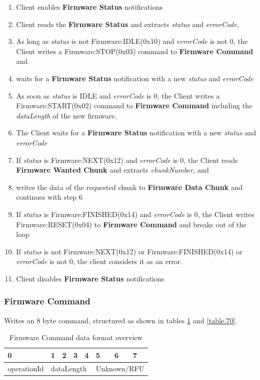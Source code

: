 \documentclass[a4paper]{article}
\begin{document}
\begin{enumerate}
	
	\item
	      Client enables \textbf{Firmware Status} notifications
	\item
	      Client reads the \textbf{Firmware Status} and extracts \emph{status}
	      and \emph{errorCode}.
	\item
	      As long as \emph{status} is not Firmware:IDLE(0x10) and \emph{errorCode} is not 0, 
	     the Client writes a Firmware:STOP(0x03) command to \textbf{Firmware Command} and
	\item
	      waits for a \textbf{Firmware Status} notification with a new
	      \emph{status} and \emph{errorCode}
	\item
	      As soon as \emph{status} is IDLE and \emph{errorCode} is 0, 
	      the Client writes a Firmware:START(0x02) command to \textbf{Firmware Command}
	      including the \emph{dataLength} of the new firmware.
	\item
	      The Client waits for a \textbf{Firmware Status} notification with a
	      new \emph{status} and \emph{errorCode}
	\item
	      If \emph{status} is Firmware:NEXT(0x12) and \emph{errorCode} is 0, 
	      the Client reads \textbf{Firmware Wanted Chunk} and extracts \emph{chunkNumber}, 
	      and
	\item
	      writes the data of the requested chunk to \textbf{Firmware Data Chunk}
	      and continues with step 6
	\item
	      If \emph{status} is Firmware:FINISHED(0x14) and \emph{errorCode} is 0,
	      the Client writes Firmware:RESET(0x04) to \textbf{Firmware Command}
	      and breaks out of the loop
	\item
	      If \emph{status} is not Firmware:NEXT(0x12) or Firmware:FINISHED(0x14)
	      or \emph{errorCode} is not 0, 
	      the client considers it as an error.
	\item
	      Client disables \textbf{Firmware Status} notifications
\end{enumerate}

\subsubsection{Firmware Command}
\label{firmware_command}

Writes an 8 byte command, structured as shown in tables \ref{table.69} and \ref{table.70}.

\begin{longtable}[]{@{}|l|l|l|l|l|l|l|l|@{}}
	\caption{Firmware Command data format overview}
	\label{table.69}\\  %
	\hline
	0 & 1 & 2 & 3 & 4 & 5 & 6 & 7 \\
	\hline
	operationId & \multicolumn{4}{|l}{%
	dataLength} & \multicolumn{3}{|l|}{%
	Unknown/RFU} \\
	\hline
\end{longtable}
\end{document}
